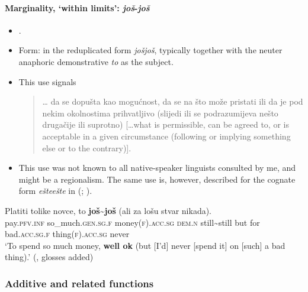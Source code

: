 \paragraph{Marginality, \lq within limits': \textit{još}-\textit{još}}\label{appendixBCMSJosJos}
\begin{itemize}
	\item \textcite[s.v. \textit{još}]{HJP}.
	\item Form: in the reduplicated form \textit{jošjoš}, typically together with the neuter anaphoric demonstrative \textit{to} as the subject.
	\item This use signals
	\begin{quote}
… da se dopušta kao mogućnost, da se na što može pristati ili da je pod nekim okolnostima prihvatljivo (slijedi ili se podrazumijeva nešto drugačije ili suprotno) {[}…what is permissible, can be agreed to, or is acceptable in a given circumstance (following or implying something else or to the contrary){]}. \parencite[s.v. \textit{još}]{HJP}
\end{quote}
	\item This use was not known to all native-speaker linguists consulted by me, and might be a regionalism. The same use is, however, described for the cognate form \textit{ešte}\textit{ešte} in  (\cite[s.v. \textit{ešte}]{SSSJ}; \cite[s.v. \textit{ešte}]{KSS4}).
\end{itemize}
\begin{exe}
	\ex
	\gll Platiti tolike novce, to \textbf{još}\sim\textbf{još} (ali za lošu stvar nikada).\\
	pay.\textsc{pfv}.\textsc{inf} so\_much.\textsc{gen}.\textsc{sg}.\textsc{f} money(\textsc{f}).\textsc{acc}.\textsc{sg} \textsc{dem}.\textsc{n} still\sim still but for bad.\textsc{acc}.\textsc{sg}.\textsc{f} thing(\textsc{f}).\textsc{acc}.\textsc{sg} never\\
\glt \lq To spend so much money, \textbf{well ok}  (but [I'd] never [spend it] on [such] a bad thing).\rq{ }(\cite[s.v. \textit{još}]{HJP}, glosses added)
\end{exe}

\subsubsection{Additive and related functions}
